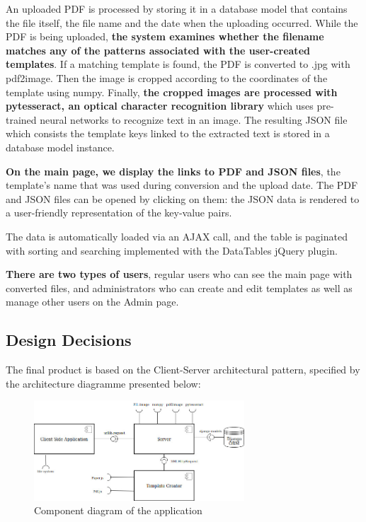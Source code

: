 \documentclass{l3proj}
\begin{document}
An uploaded PDF is processed by storing it in a database model that contains the file itself, the file name and the date when the uploading occurred. While the PDF is being uploaded, \textbf{the system examines whether the filename matches any of the patterns associated with the user-created templates}. If a matching template is found, the PDF is converted to .jpg with pdf2image. Then the image is cropped according to the coordinates of the template using numpy. Finally, \textbf{the cropped images are processed with pytesseract, an optical character recognition library} which uses pre-trained neural networks to recognize text in an image. The resulting JSON file which consists the template keys linked to the extracted text is stored in a database model instance.

\textbf{On the main page, we display the links to PDF and JSON files}, the template’s name that was used during conversion and the upload date. The PDF and JSON files can be opened by clicking on them: the JSON data is rendered to a user-friendly representation of the key-value pairs.

The data is automatically loaded via an AJAX call, and the table is paginated with sorting and searching implemented with the DataTables jQuery plugin.

\textbf{There are two types of users}, regular users who can see the main page with converted files, and administrators who can create and edit templates as well as manage other users on the Admin page.




\subsection{Design Decisions}

The final product is based on the Client-Server architectural pattern, specified by the architecture diagramme presented below:

\begin{figure}[h]
\includegraphics[width=0.7\textwidth]{figures/ComponentDiagram.png}
\centering
\caption{Component diagram of the application}
\label{fig:componentDiagram}
\end{figure}
\end{document}
